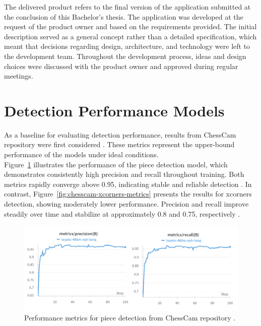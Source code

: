 The delivered product refers to the final version of the application submitted at the conclusion of this Bachelor’s thesis. The application was developed at the request of the product owner and based on the requirements provided. The initial description served as a general concept rather than a detailed specification, which meant that decisions regarding design, architecture, and technology were left to the development team. Throughout the development process, ideas and design choices were discussed with the product owner and approved during regular meetings.

\section{Detection Performance Models}
\label{chesscam-metrics}
As a baseline for evaluating detection performance, results from ChessCam repository were first considered \cite{github:chesscam}. These metrics represent the upper-bound performance of the models under ideal conditions. \\

Figure~\ref{fig:chesscam-piece-metrics} illustrates the performance of the piece detection model, which demonstrates consistently high precision and recall throughout training. Both metrics rapidly converge above 0.95, indicating stable and reliable detection \cite{wandb:piece-detection}. In contrast, Figure~\ref{fig:chesscam-xcorners-metrics} presents the results for xcorners detection, showing moderately lower performance. Precision and recall improve steadily over time and stabilize at approximately 0.8 and 0.75, respectively \cite{wandb:xcorner-detection}. \\

\begin{figure}[H]
\centering
\includegraphics[width=\textwidth]{figures/results/machine-learning/piece-metrics.png}
\caption[Performance piece detection (ChessCam)]{Performance metrics for piece detection from ChessCam repository \cite{wandb:piece-detection}.}
\label{fig:chesscam-piece-metrics}
\end{figure}

